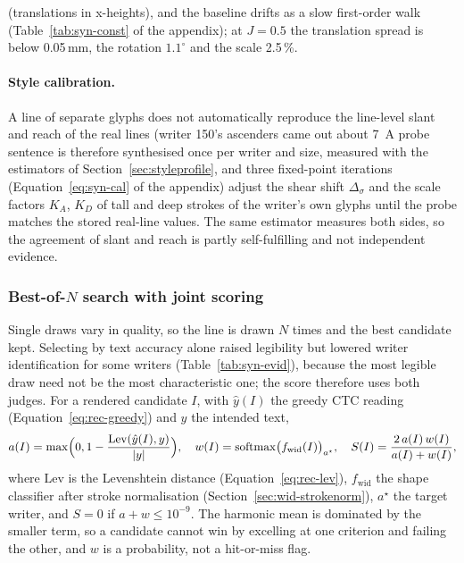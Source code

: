 (translations in x-heights), and the baseline drifts as a slow first-order walk (Table~\ref{tab:syn-const} of the appendix); at $J=0.5$ the translation spread is below 0.05\,mm, the rotation $1.1^\circ$ and the scale 2.5\,\%.

\paragraph{Style calibration.}
\label{sec:syn-cal}
A line of separate glyphs does not automatically reproduce the line-level slant and reach of the real lines (writer 150's ascenders came out about 7\,%
A probe sentence is therefore synthesised once per writer and size, measured with the estimators of Section~\ref{sec:styleprofile}, and three fixed-point iterations (Equation~\ref{eq:syn-cal} of the appendix) adjust the shear shift $\Delta_\sigma$ and the scale factors $K_A$, $K_D$ of tall and deep strokes of the writer's own glyphs until the probe matches the stored real-line values.
The same estimator measures both sides, so the agreement of slant and reach is partly self-fulfilling and not independent evidence.

\subsubsection{Best-of-$N$ search with joint scoring}
\label{sec:syn-search}

Single draws vary in quality, so the line is drawn $N$ times and the best candidate kept.
Selecting by text accuracy alone raised legibility but lowered writer identification for some writers (Table~\ref{tab:syn-evid}), because the most legible draw need not be the most characteristic one; the score therefore uses both judges.
For a rendered candidate $I$, with $\hat y(I)$ the greedy CTC reading (Equation~\ref{eq:rec-greedy}) and $y$ the intended text,
\begin{equation}
a(I)=\max\Bigl(0,1-\frac{\mathrm{Lev}(\hat y(I),y)}{|y|}\Bigr),\quad w(I)=\mathrm{softmax}\bigl(f_{\mathrm{wid}}(I)\bigr)_{a^\star},\quad S(I)=\frac{2\,a(I)\,w(I)}{a(I)+w(I)},
\label{eq:syn-score}
\end{equation}
where $\mathrm{Lev}$ is the Levenshtein distance (Equation~\ref{eq:rec-lev}), $f_{\mathrm{wid}}$ the shape classifier after stroke normalisation (Section~\ref{sec:wid-strokenorm}), $a^\star$ the target writer, and $S=0$ if $a+w\le10^{-9}$.
The harmonic mean is dominated by the smaller term, so a candidate cannot win by excelling at one criterion and failing the other, and $w$ is a probability, not a hit-or-miss flag.

